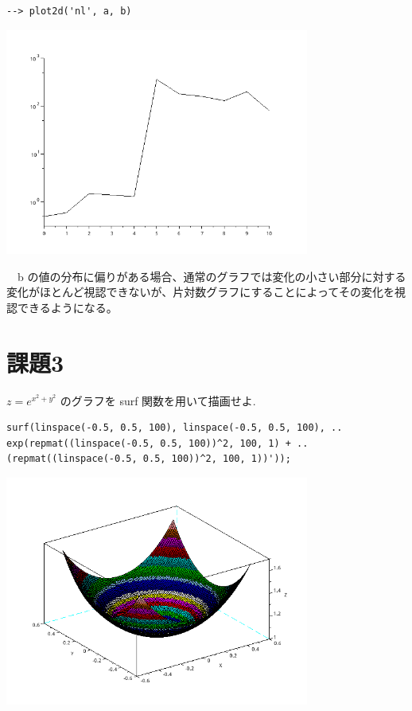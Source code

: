 \documentclass[a4j, 11pt]{jarticle}
\begin{document}
\begin{verbatim}
--> plot2d('nl', a, b)
\end{verbatim}
\begin{center}
\includegraphics[width=10cm]{./2-kata.png}
\end{center}
　b の値の分布に偏りがある場合、通常のグラフでは変化の小さい部分に対する変化がほとんど視認できないが、片対数グラフにすることによってその変化を視認できるようになる。\\
\section{課題3}
\label{sec:org1a3c2a0}
\(z = e^{x^2+y^2}\) のグラフを surf 関数を用いて描画せよ.\\
\begin{verbatim}
surf(linspace(-0.5, 0.5, 100), linspace(-0.5, 0.5, 100), ..
exp(repmat((linspace(-0.5, 0.5, 100))^2, 100, 1) + ..
(repmat((linspace(-0.5, 0.5, 100))^2, 100, 1))'));
\end{verbatim}
\begin{center}
\includegraphics[width=10cm]{./3.png}
\end{center}
\end{document}
